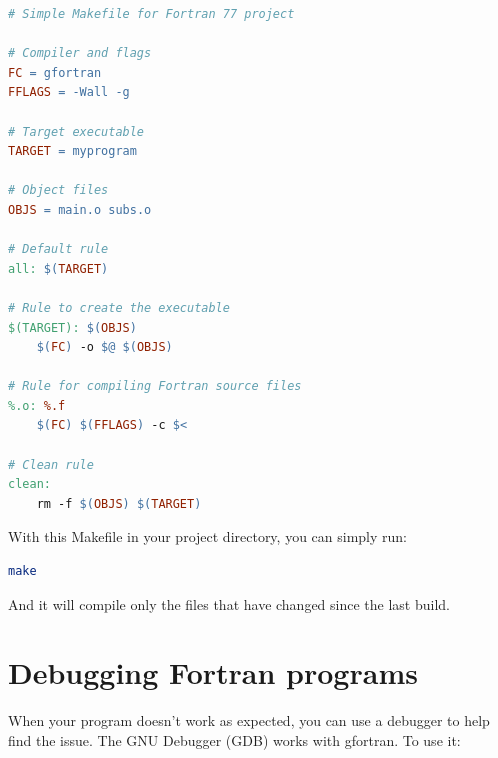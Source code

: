 \begin{lstlisting}[language=make]
# Simple Makefile for Fortran 77 project

# Compiler and flags
FC = gfortran
FFLAGS = -Wall -g

# Target executable
TARGET = myprogram

# Object files
OBJS = main.o subs.o

# Default rule
all: $(TARGET)

# Rule to create the executable
$(TARGET): $(OBJS)
	$(FC) -o $@ $(OBJS)

# Rule for compiling Fortran source files
%.o: %.f
	$(FC) $(FFLAGS) -c $<

# Clean rule
clean:
	rm -f $(OBJS) $(TARGET)
\end{lstlisting}

With this Makefile in your project directory, you can simply run:

\begin{lstlisting}[language=bash]
make
\end{lstlisting}

And it will compile only the files that have changed since the last build.

\section{Debugging Fortran programs}

When your program doesn't work as expected, you can use a debugger to help find the issue. The GNU Debugger (GDB) works with gfortran. To use it:

